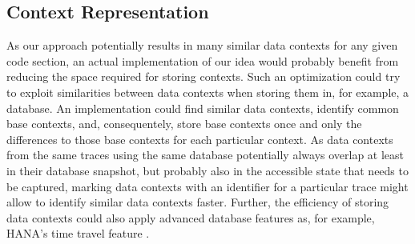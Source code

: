 \subsection{Context Representation}
As our approach potentially results in many similar data contexts for any given code section, an actual implementation of our idea would probably benefit from reducing the space required for storing contexts.
Such an optimization could try to exploit similarities between data contexts when storing them in, for example, a database.
An implementation could find similar data contexts, identify common base contexts, and, consequentely, store base contexts once and only the differences to those base contexts for each particular context.
As data contexts from the same traces using the same database potentially always overlap at least in their database snapshot, but probably also in the accessible state that needs to be captured, marking data contexts with an identifier for a particular trace might allow to identify similar data contexts faster.
Further, the efficiency of storing data contexts could also apply advanced database features as, for example, HANA's time travel feature .
